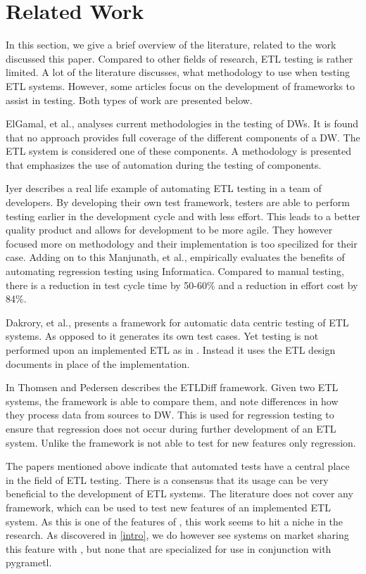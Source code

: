 \section{Related Work}\label{sect:RelatedWork}
In this section, we give a brief overview of the literature, related to the work discussed this paper. Compared to other fields of research, ETL testing is rather limited. A lot of the literature discusses, what methodology to use when testing ETL systems. However, some articles focus on the development of frameworks to assist in testing. Both types of work are presented below.

ElGamal, et al.,  \cite{elgamal2012towards} analyses current methodologies in the testing of DWs. It is found that no approach provides full coverage of the different components of a DW. The ETL system is considered one of these components. A methodology is presented that emphasizes the use of automation during the testing of components.

Iyer \cite{subuiyer2014} describes a real life example of automating ETL testing in a team of developers. By developing their own test framework, testers are able to perform testing earlier in the development cycle and with less effort. This leads to a better quality product and allows for development to be more agile. They however focused more on methodology and their implementation is too specilized for their case. Adding on to this Manjunath, et al., \cite{manjunath2012case} empirically evaluates the benefits of automating regression testing using Informatica. Compared to manual testing, there is a reduction in test cycle time by 50-60\% and a reduction in effort cost by 84\%.

Dakrory, et al.,  \cite{dakroryautomated} presents a framework for automatic data centric testing of ETL systems. As opposed to \FW{} it generates its own test cases. Yet testing is not performed upon an implemented ETL as in \FW{}. Instead it uses the ETL design documents in place of the implementation.

In \cite{thomsen2006etldiff} Thomsen and Pedersen describes the ETLDiff framework. Given two ETL systems, the framework is able to compare them, and note differences in how they process data from sources to DW. This is used for regression testing to ensure that regression does not occur during further development of an ETL system. Unlike \FW the framework is not able to test for new features only regression.

The papers mentioned above indicate that automated tests have a central place in the field of ETL testing. There is a consensus that its usage can be very beneficial to the development of ETL systems. The literature does not cover any framework, which can be used to test new features of an implemented ETL system. As this is one of the features of \FW{}, this work seems to hit a niche in the research. As discovered in \cref{intro}, we do however see systems on market sharing this feature with \FW{}, but none that are specialized for use in conjunction with pygrametl.
